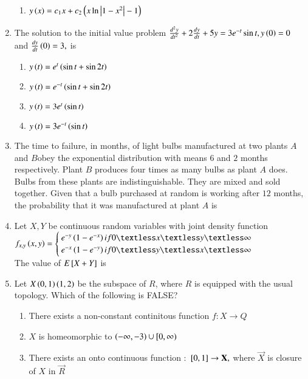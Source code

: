 \documentclass[journal]{IEEEtran}
\begin{document}
\begin{enumerate}
\begin{enumerate}
        \item $y\left(x\right)=c_1x+c_2\left(x\ln\left\vert1-x^2\right\vert-1\right)$\\
    \end{enumerate}
    \item The solution to the initial value problem $\frac{d^2y}{dt^2}+2\frac{dy}{dt}+5y=3e^{-t}\sin{t},y\left(0\right)=0$ and $\frac{dy}{dt}\left(0\right)=3,$ is
    \begin{enumerate}
        \item $y\left(t\right)=e^{t}\left(\sin{t}+\sin{2t}\right)$
        \item $y\left(t\right)=e^{-t}\left(\sin{t}+\sin{2t}\right)$
        \item $y\left(t\right)=3e^{t}\left(\sin{t}\right)$
        \item $y\left(t\right)=3e^{-t}\left(\sin{t}\right)$ \\
    \end{enumerate}
    \item The time to failure, in months, of light bulbs manufactured at two plants $A$ and $B $obey the exponential distribution with means $6$ and $2$ months respectively. Plant $B$ produces four times as many bulbs as plant $A$ does. Bulbs from these plants are indistinguishable. They are mixed and sold together. Given that a bulb purchased at random is working after $12$ months, the probability that it was manufactured at plant $A$ is\\
    \item Let $X,Y$ be continuous random variables with joint density function\\
    $f_{x,y}\brak{x,y}=\begin{cases}
        e^{-y}\brak{1-e^{-x}}  if  0\textless x\textless y \textless\infty\\ e^{-x}\brak{1-e^{-y}}  if  0\textless y\textless x \textless\infty
    \end{cases}$\\
    The value of  $E{}\left[X+Y\right]$ is \\
    \item Let $X\left(0,1\right) \left(1,2\right)$ be the subspace of $R$, where $R$ is equipped with the usual topology. Which of the following is FALSE?
    \begin{enumerate}
        \item There exists a non-constant continitous function $f:X\rightarrow Q$
        \item  $X$ is homeomorphic to $\left(-\infty,-3\right)\cup[ 0,\infty ) $ 
        \item There exists an onto continuous function : ${}\left[0,1\right]\rightarrow \mathbf{X},$ where $\Vec{X}$ is closure of $X$ in $\vec{R}$

\end{enumerate}
\end{enumerate}
\end{document}
